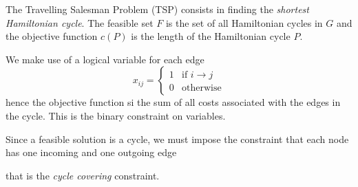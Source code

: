 The Travelling Salesman Problem (TSP) consists in finding the \emph{shortest Hamiltonian cycle}. The feasible set $F$ is the set of all Hamiltonian cycles in $G$ and the objective function $c(P)$ is the length of the Hamiltonian cycle $P$.

We make use of a logical variable for each edge
\[
x_{ij}=
\begin{cases}
	1 & \text{if $i\rightarrow j$} \\
	0 & \text{otherwise}
\end{cases}
\]
hence the objective function si the sum of all costs associated with the edges in the cycle. This is the binary constraint on variables.

Since a feasible solution is a cycle, we must impose the constraint that each node has one incoming and one outgoing edge\par
\begin{center}
\end{center}
that is the \emph{cycle covering} constraint.


